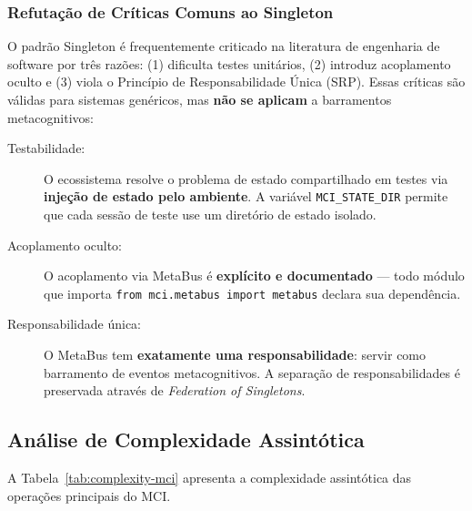 \subsubsection*{Refutação de Críticas Comuns ao Singleton}

O padrão Singleton é frequentemente criticado na literatura de engenharia de software \cite{Gamma1994_DesignPatterns} por três razões: (1) dificulta testes unitários, (2) introduz acoplamento oculto e (3) viola o Princípio de Responsabilidade Única (SRP). Essas críticas são válidas para sistemas genéricos, mas \textbf{não se aplicam} a barramentos metacognitivos:

\begin{description}
    \item[Testabilidade:] O ecossistema resolve o problema de estado compartilhado em testes via \textbf{injeção de estado pelo ambiente}. A variável \texttt{MCI\_STATE\_DIR} permite que cada sessão de teste use um diretório de estado isolado.
    \item[Acoplamento oculto:] O acoplamento via MetaBus é \textbf{explícito e documentado} — todo módulo que importa \texttt{from mci.metabus import metabus} declara sua dependência.
    \item[Responsabilidade única:] O MetaBus tem \textbf{exatamente uma responsabilidade}: servir como barramento de eventos metacognitivos. A separação de responsabilidades é preservada através de \textit{Federation of Singletons}.
\end{description}

\subsection{Análise de Complexidade Assintótica}

A Tabela~\ref{tab:complexity-mci} apresenta a complexidade assintótica das operações principais do MCI.

